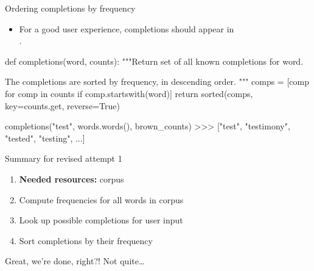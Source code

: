 \documentclass[professionalfonts, xcolor={usenames,svgnames,x11names,table}]{beamer}
\begin{document}
\begin{frame}[fragile]{Ordering completions by frequency}
    \begin{itemize}
        \item For a good user experience, completions should appear in\\
              .
    \end{itemize}

    \begin{pythoncode}
        def completions(word, counts):
            """Return set of all known completions for word.

            The completions are sorted by frequency,
            in descending order.
            """
            comps = [comp for comp in counts
                     if comp.startswith(word)]
            return sorted(comps,
                          key=counts.get,
                          reverse=True)
    \end{pythoncode}

    \begin{pythoncode}
        completions("test", words.words(), brown_counts)
        >>> ["test", "testimony", "tested", "testing", ...]
    \end{pythoncode}
\end{frame}

\begin{frame}{Summary for revised attempt 1}
    \begin{enumerate}
        \item \textbf{Needed resources:} corpus
        \item Compute frequencies for all words in corpus
        \item Look up possible completions for user input
        \item Sort completions by their frequency
    \end{enumerate}

    \begin{center}
        Great, we're done, right?! Not quite\ldots
    \end{center}
\end{frame}
\end{document}
